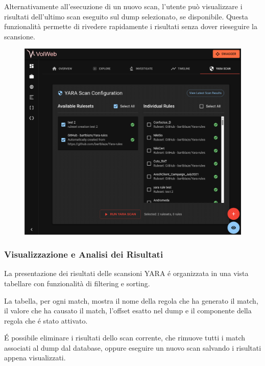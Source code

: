 Alternativamente all'esecuzione di un nuovo scan, l'utente può visualizzare i risultati dell'ultimo scan eseguito sul dump selezionato, se disponibile. Questa funzionalità permette di rivedere rapidamente i risultati senza dover rieseguire la scansione.

\begin{figure}[H]
\centering
\includegraphics[width=1\linewidth]{images/volweb-esteso/volweb-scanview.png}
\end{figure}

\subsubsection{Visualizzazione e Analisi dei Risultati}

La presentazione dei risultati delle scansioni YARA é organizzata in una vista tabellare con funzionalità di filtering e sorting. 

La tabella, per ogni match, mostra il nome della regola che ha generato il match, il valore che ha causato il match, l'offset esatto nel dump e il componente della regola che é stato attivato.

É possibile eliminare i risultati dello scan corrente, che rimuove tutti i match associati al dump dal database, oppure eseguire un nuovo scan salvando i risultati appena visualizzati.

